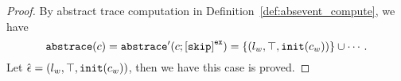 \begin{proof}
      By abstract trace computation in Definition~\ref{def:absevent_compute}, we have
      \[
        \absflow(c) = \absflow'(c; \clabel{\eskip}^{\lex}) = \{(l_w, \top, \init(c_w))\} \cup \cdots.
      \]
      Let $\hat{\mathtt{\epsilon}{}} = (l_w, \top, \mathtt{init}(c_w))$, then we have this case is proved.

\end{proof}
